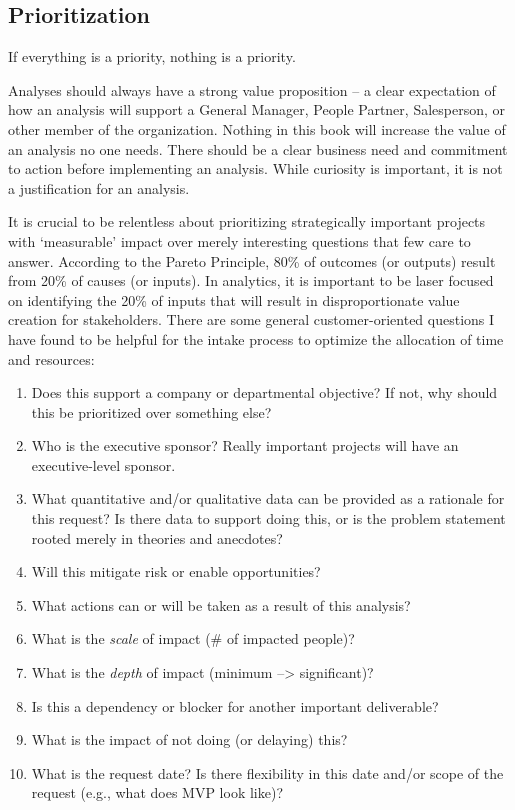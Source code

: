 \documentclass[
]{book}
\providecommand{\tightlist}{%
  \setlength{\itemsep}{0pt}\setlength{\parskip}{0pt}}
\begin{document}
\hypertarget{prioritization}{%
\subsection{Prioritization}\label{prioritization}}

If everything is a priority, nothing is a priority.

Analyses should always have a strong value proposition -- a clear expectation of how an analysis will support a General Manager, People Partner, Salesperson, or other member of the organization. Nothing in this book will increase the value of an analysis no one needs. There should be a clear business need and commitment to action before implementing an analysis. While curiosity is important, it is not a justification for an analysis.

It is crucial to be relentless about prioritizing strategically important projects with `measurable' impact over merely interesting questions that few care to answer. According to the Pareto Principle, 80\% of outcomes (or outputs) result from 20\% of causes (or inputs). In analytics, it is important to be laser focused on identifying the 20\% of inputs that will result in disproportionate value creation for stakeholders. There are some general customer-oriented questions I have found to be helpful for the intake process to optimize the allocation of time and resources:

\begin{enumerate}
\def\labelenumi{\arabic{enumi}.}
\tightlist
\item
  Does this support a company or departmental objective? If not, why should this be prioritized over something else?
\item
  Who is the executive sponsor? Really important projects will have an executive-level sponsor.
\item
  What quantitative and/or qualitative data can be provided as a rationale for this request? Is there data to support doing this, or is the problem statement rooted merely in theories and anecdotes?
\item
  Will this mitigate risk or enable opportunities?
\item
  What actions can or will be taken as a result of this analysis?
\item
  What is the \emph{scale} of impact (\# of impacted people)?
\item
  What is the \emph{depth} of impact (minimum --\textgreater{} significant)?
\item
  Is this a dependency or blocker for another important deliverable?
\item
  What is the impact of not doing (or delaying) this?
\item
  What is the request date? Is there flexibility in this date and/or scope of the request (e.g., what does MVP look like)?
\end{enumerate}
\end{document}
